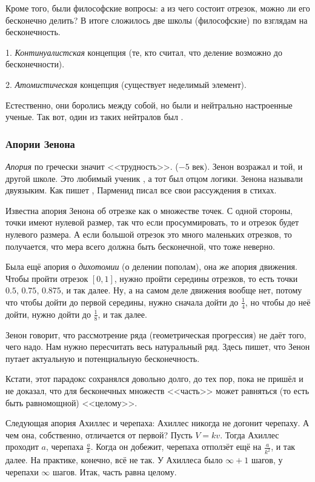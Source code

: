 \documentclass[a4paper,oneside,fleqn,10pt]{article}
\begin{document}
Кроме того, были философские вопросы: а из чего состоит отрезок, можно
ли его бесконечно делить?  В итоге сложилось две школы (философские)
по взглядам на бесконечность.

1. \emph{Континуалистская} концепция (те, кто считал, что деление
возможно до бесконечности).

2. \emph{Атомистическая} концепция (существует неделимый элемент).

Естественно, они боролись между собой, но были и нейтрально
настроенные ученые.  Так вот, один из таких нейтралов был
.

\subsubsection{Апории Зенона}

\emph{Апория} по гречески значит <<трудность>>. 
($-5$ век).  Зенон возражал и той, и другой школе.  Это любимый ученик
, а тот был отцом логики.  Зенона называли
двуязыким.  Как пишет , Парменид писал все свои
рассуждения в стихах.

Известна апория Зенона об отрезке как о множестве точек.  С одной
стороны, точки имеют нулевой размер, так что если просуммировать, то и
отрезок будет нулевого размера. А если большой отрезок это много
маленьких отрезков, то получается, что мера всего должна быть
бесконечной, что тоже неверно.

Была ещё апория о \emph{дихотомии} (о делении пополам), она же апория
движения.  Чтобы пройти отрезок $[0,1]$, нужно пройти середины
отрезков, то есть точки $0.5$, $0.75$, $0.875$, и так далее.  Ну, а на
самом деле движения вообще нет, потому что чтобы дойти до первой
середины, нужно сначала дойти до $\frac14$, но чтобы до неё дойти,
нужно дойти до $\frac18$, и так далее.

Зенон говорит, что рассмотрение ряда (геометрическая прогрессия) не
даёт того, чего надо. Нам нужно пересчитать весь натуральный
ряд. Здесь  пишет, что Зенон путает актуальную и
потенциальную бесконечность.

Кстати, этот парадокс сохранялся довольно долго, до тех пор, пока не
пришёл  и не доказал, что для бесконечных
множеств <<часть>> может равняться (то есть быть равномощной)
<<целому>>.

Следующая апория Ахиллес и черепаха: Ахиллес никогда не догонит
черепаху.  А чем она, собственно, отличается от первой? Пусть $V =
kv$. Тогда Ахиллес проходит $a$, черепаха $\frac{a}{k}$.  Когда он
добежит, черепаха отползёт ещё на $\frac{a}{k^2}$, и так далее.  На
практике, конечно, всё не так. У Ахиллеса было $\infty + 1$ шагов, у
черепахи $\infty$ шагов. Итак, часть равна целому.
\end{document}
